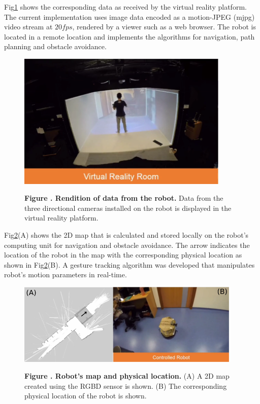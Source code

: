 Fig\ref{fig:VR_setup} shows the corresponding data as received by the virtual reality platform. The current implementation uses image data encoded as a motion-JPEG (mjpg) video stream at $20fps$, rendered by a viewer such as a web browser. The robot is located in a remote location and implements the algorithms for navigation, path planning and obstacle avoidance.
\begin{figure}[h!]
  \begin{center}
    \includegraphics[width=0.90\textwidth]{figures/motion-seg/VR-Robot}%
  \end{center}
  \textbf{\label{fig:VR_setup} Figure . Rendition of data from the robot.} { Data from the three directional cameras installed on the robot is displayed in the virtual reality platform. }
\end{figure}

Fig\ref{fig:robot-env}(A) shows the 2D map that is calculated and stored locally on the robot's computing unit for navigation and obstacle avoidance. The arrow indicates the location of the robot in the map with the corresponding physical location as shown in Fig\ref{fig:robot-env}(B). A gesture tracking algorithm was developed that manipulates robot's motion parameters in real-time.
\begin{figure}[h!]
  \begin{center}
    \includegraphics[width=0.95\textwidth]{figures/motion-seg/robot-env}%
  \end{center}
  \textbf{\label{fig:robot-env} Figure . Robot's map and physical location.} { (A) A 2D map created using the RGBD sensor is shown. (B) The corresponding physical location of the robot is shown. }
\end{figure}

